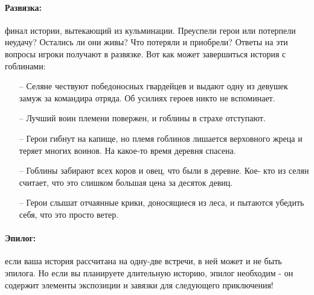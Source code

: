 \paragraph{Развязка:} финал истории, вытекающий из кульминации. Преуспели герои или потерпели неудачу? Остались ли они живы? Что потеряли и приобрели? Ответы на эти вопросы игроки получают в развязке. Вот как может завершиться история с гоблинами:
\begin{itemize}
\item[--] Селяне чествуют победоносных гвардейцев и выдают одну из девушек замуж за командира отряда. Об усилиях героев никто не вспоминает.
\item[--] Лучший воин племени повержен, и гоблины в страхе отступают.
\item[--] Герои гибнут на капище, но племя гоблинов лишается верховного жреца и теряет многих воинов. На какое-то время деревня спасена.
\item[--] Гоблины забирают всех коров и овец, что были в деревне. Кое- кто из селян считает, что это слишком большая цена за десяток девиц.
\item[--] Герои слышат отчаянные крики, доносящиеся из леса, и пытаются убедить себя, что это просто ветер.
\end{itemize}
\paragraph{Эпилог:} если ваша история рассчитана на одну-две встречи, в ней может и не быть эпилога. Но если вы планируете длительную историю, эпилог необходим - он содержит элементы экспозиции и завязки для следующего приключения!